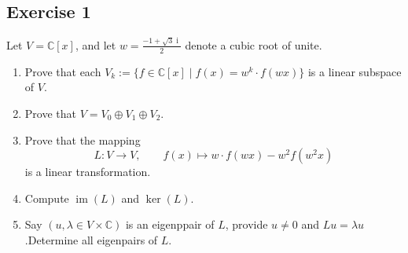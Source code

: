 \documentclass[11pt]{ctexart}
\theoremstyle{definition}
\numberwithin{equation}{section}
\newcommand{\op}[1]{\operatorname{#1}}%
\newcommand{\CC}{\mathbb{C}}
\theoremstyle{definition}
\theoremstyle{remark}
\begin{document}
\subsection{Exercise 1}
Let $V= \CC[x] $, and let $w= \frac{-1+\sqrt3\op{i}}{2}$ denote a cubic root of unite.
\begin{enumerate}
    \item Prove that each $V_k:=\{f\in \CC [x]\mid f(x)=w^k\cdot f(wx)\}$ is a linear subspace of $V$.
    \item Prove that $V=V_0\oplus V_1\oplus V_2$.
    \item Prove that the mapping \[L: V\to V, \qquad f(x)\mapsto w\cdot f(wx)-w^2f(w^2x)\]is a linear transformation.
    \item Compute $\op{im}(L)$ and $\ker(L)$.
    \item Say $(u,\lambda \in V\times \CC)$ is an eigenppair of $L$, provide $u\neq 0$ and $Lu=\lambda u$.Determine all eigenpairs of $L$.
\end{enumerate}
\end{document}
